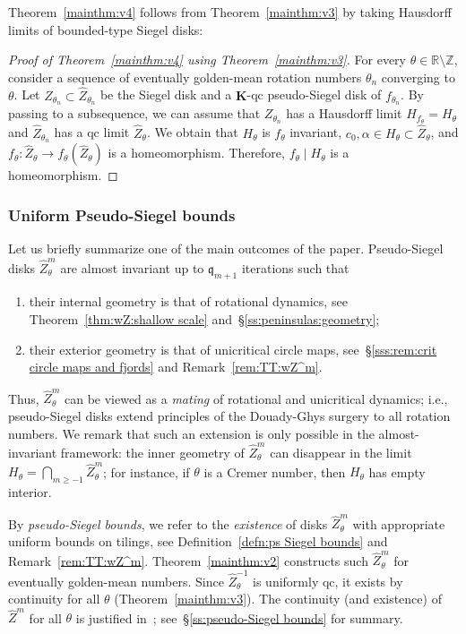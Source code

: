 \documentclass{amsart}
\makeatletter
\newcommand{\1}{{\mathbb 1 }}
\newcommand{\setword}[2]{%
  \phantomsection
  #1\def\@currentlabel{\unexpanded{#1}}\label{#2}%
}
\newcommand{\wZ}{{\widehat Z}}
\newcommand{\bK}{{\mathbf K}}
\newcommand{\qq}{\mathfrak{q}}
\newcommand{\R}{\mathbb{R}}
\newcommand{\Z}{\mathbb{Z}}
\theoremstyle{remark}
\numberwithin{equation}{section}
\theoremstyle{definition}
\makeatother
\begin{document}
Theorem~\ref{mainthm:v4} follows from Theorem~\ref{mainthm:v3} by taking Hausdorff limits of bounded-type Siegel disks:

\begin{proof}[Proof of Theorem~\ref{mainthm:v4} using Theorem~\ref{mainthm:v3}]
For every $\theta\in \R\setminus \Z$, consider a sequence of eventually golden-mean rotation numbers $\theta_n$ converging to $\theta$. Let $Z_{\theta_n}\subset \wZ_{\theta_n}$ be the Siegel disk and a $\bK$-qc pseudo-Siegel disk of $f_{\theta_n}$. By passing to a subsequence, we can assume that $Z_{\theta_n}$ has a Hausdorff limit $H_{f_\theta}=H_{\theta}$ and $\wZ_{\theta_n}$ has a qc limit $\wZ_{\theta}$. We obtain that $H_\theta$ is $f_\theta$ invariant, $c_0, \alpha\in H_\theta\subset \wZ_{\theta}$, and $f_\theta\colon  \wZ_{\theta}\to f_\theta \left(  \wZ_{\theta}\right)$ is a homeomorphism. Therefore, $f_\theta\mid H_\theta$ is a homeomorphism.  
\end{proof}


\subsubsection{Uniform Pseudo-Siegel bounds}\label{sss:uniform wZ bounds} Let us briefly summarize one of the main outcomes of the paper. Pseudo-Siegel disks $\wZ^m_\theta$ are almost invariant up to $\qq_{m+1}$ iterations such that 
\begin{enumerate}
\item[\setword{(I)}{Item:wZ:I}] their internal geometry is that of rotational dynamics, see Theorem~\ref{thm:wZ:shallow scale} and~\S\ref{ss:peninsulas:geometry};
\item[\setword{(O)}{Item:wZ:O}] their exterior geometry is that of unicritical circle maps, see~\S\ref{sss:rem:crit circle maps and fjords} and Remark~\ref{rem:TT:wZ^m}.
\end{enumerate}
Thus, $\wZ^m_\theta$ can be viewed as a \emph{mating} of rotational and unicritical dynamics; i.e., pseudo-Siegel disks extend principles of the Douady-Ghys surgery to all rotation numbers. We remark that such an extension is only possible in the almost-invariant framework: the inner geometry of $\wZ^m_\theta$ can disappear in the limit $H_\theta=\bigcap _{m\ge -1}\wZ^m_\theta$; for instance, if $\theta$ is a Cremer number, then $H_\theta$ has empty interior.

By \emph{pseudo-Siegel bounds}, we refer to the \emph{existence} of disks $\wZ^m_\theta$ with appropriate uniform bounds on tilings, see Definition~\ref{defn:ps Siegel bounds} and Remark~\ref{rem:TT:wZ^m}. Theorem~\ref{mainthm:v2} constructs such $\wZ^m_\theta$ for eventually golden-mean numbers. Since $\wZ^{-1}_\theta$ is uniformly qc, it exists by continuity for all $\theta$ (Theorem~\ref{mainthm:v3}). The continuity (and existence) of $\wZ^m$ for all $\theta$ is justified in~\cite{DL:sector bounds}; see~\S\ref{ss:pseudo-Siegel bounds} for summary.
\end{document}

